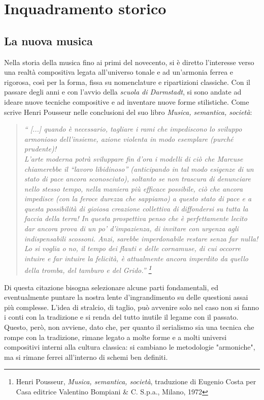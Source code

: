 
\chapter{Inquadramento storico}
\label{chp:Inquadramento storico}

\section{La nuova musica}
Nella storia della musica fino ai primi del novecento, si è diretto l’interesse verso una realtà compositiva legata all’universo tonale e ad un’armonia ferrea e rigorosa, così per la forma, fissa su nomenclature e ripartizioni classiche. Con il passare degli anni e con l’avvio della \textit{scuola di Darmstadt}, si sono andate ad ideare nuove tecniche compositive e ad inventare nuove forme stilistiche. Come scrive Henri Pousseur nelle conclusioni del suo libro \textit{Musica, semantica, società}:
\begin{quotation}
\textit{“ [...] quando è necessario, tagliare i rami che impediscono lo sviluppo armonioso dell’insieme, azione violenta in modo esemplare (purché prudente)! \\ 
L’arte moderna potrà sviluppare fin d’ora i modelli di ciò che Marcuse chiamerebbe il “lavoro libidinoso” (anticipando in tal modo esigenze di un stato di pace ancora sconosciuto), soltanto se non trascura di denunciare nello stesso tempo, nella maniera più efficace possibile, ciò che ancora impedisce (con la feroce durezza che sappiamo) a questo stato di pace e a questa possibilità di gioiosa creazione collettiva di diffondersi su tutta la faccia della terra! In questa prospettiva penso che è perfettamente lecito dar ancora prova di un po’ d’impazienza, di invitare con urgenza agli indispensabili scossoni. Anzi, sarebbe imperdonabile restare senza far nulla! Lo si voglia o no, il tempo dei flauti e delle cornamuse, di cui occorre intuire e far intuire la felicità, è attualmente ancora imperdito da quello della tromba, del tamburo e del Grido.” \footnote{Henri Pousseur, \textit{Musica, semantica, società}, traduzione di Eugenio Costa per Casa editrice Valentino Bompiani \& C. S.p.a., Milano, 1972}}
\end{quotation}
Di questa citazione bisogna selezionare alcune parti fondamentali, ed eventualmente puntare la nostra lente d'ingrandimento su delle questioni assai più complesse. L'idea di stralcio, di taglio, può avvenire solo nel caso non si fanno i conti con la tradizione e si renda del tutto inutile il legame con il passato. Questo, però, non avviene, dato che, per quanto il serialismo sia una tecnica che rompe con la tradizione, rimane legato a molte forme e a molti universi compositivi interni alla cultura classica: si cambiano le metodologie "armoniche", ma si rimane ferrei all'interno di schemi ben definiti. \\
